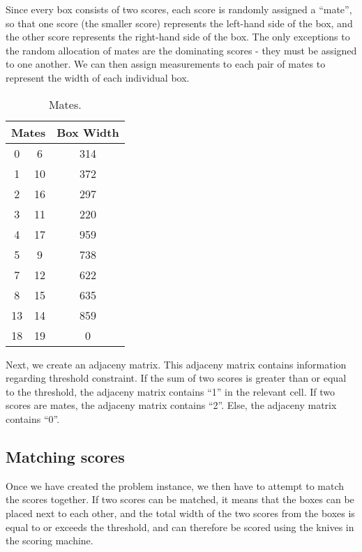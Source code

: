 \documentclass[a4paper, 11pt, twoside, onecolumn, openany]{article}
\begin{document}
Since every box consists of two scores, each score is randomly assigned a ``mate'', so that one score (the smaller score) represents the left-hand side of the box, and the other score represents the right-hand side of the box. The only exceptions to the random allocation of mates are the dominating scores - they must be assigned to one another. We can then assign measurements to each pair of mates to represent the width of each individual box. %

\begin{table}[htb]
	\centering
	\begin{tabular}{|c|c|c|}
	\hline
	\multicolumn{2}{|c|}{Mates} & Box Width \\ \hline
	0 & 6 & 314 \\ \hline
	1 & 10 & 372 \\ \hline
	2 & 16 & 297 \\ \hline
	3 & 11 & 220 \\ \hline
	4 & 17 & 959 \\ \hline
	5 & 9 & 738 \\ \hline
	7 & 12 & 622 \\ \hline
	8 & 15 & 635 \\ \hline
	13 & 14 & 859 \\ \hline
	18 & 19 & 0 \\
	\hline
	\end{tabular}
	\caption{Mates.}
\end{table}	

Next, we create an adjaceny matrix. This adjaceny matrix contains information regarding threshold constraint. If the sum of two scores is greater than or equal to the threshold, the adjaceny matrix contains ``1'' in the relevant cell. If two scores are mates, the adjaceny matrix contains ``2''. Else, the adjaceny matrix contains ``0''. %

\subsection{Matching scores}
Once we have created the problem instance, we then have to attempt to match the scores together. If two scores can be matched, it means that the boxes can be placed next to each other, and the total width of the two scores from the boxes is equal to or exceeds the threshold, and can therefore be scored using the knives in the scoring machine. 
\end{document}
